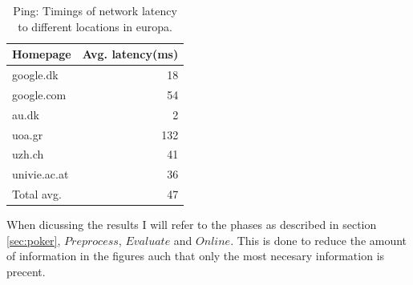 \documentclass[twoside,11pt,openright]{report}
\begin{document}
\begin{table}
\centering
\begin{tabular}{l || r}
Homepage & Avg. latency(ms)    \\
\hline
google.dk    &  18    \\
google.com   &  54    \\
au.dk        &   2    \\
uoa.gr       & 132    \\
uzh.ch       &  41    \\
univie.ac.at &  36    \\
\hline
Total avg.   &  47
\end{tabular}
\caption{Ping: Timings of network latency to different locations in europa.}
\label{table:ping}
\end{table}

When dicussing the results I will refer to the phases as described in section \ref{sec:poker}, $Preprocess$, $Evaluate$ and $Online$. This is done to reduce the amount of information in the figures auch that only the most necesary information is precent.

\bigskip
\end{document}
